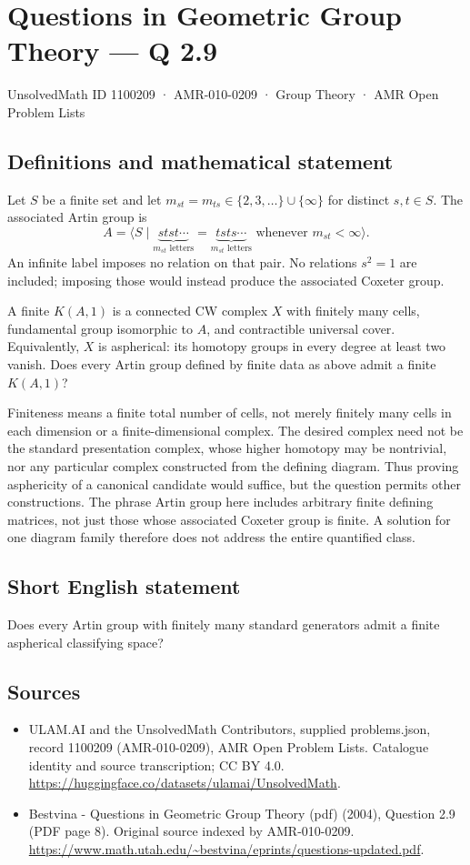 \documentclass[11pt,a4paper]{article}
\begin{document}
\section*{Questions in Geometric Group Theory — Q 2.9}\label{1100209}
{\small UnsolvedMath ID 1100209 · AMR-010-0209 · Group Theory · AMR Open Problem Lists}
\subsection{Definitions and mathematical statement}
Let $S$ be a finite set and let $m_{st}=m_{ts}\in\{2,3,\ldots\}\cup\{\infty\}$ for distinct $s,t\in S$. The associated Artin group is
\[
 A=\langle S\mid
 \underbrace{stst\cdots}_{m_{st}\text{ letters}}
 =\underbrace{tsts\cdots}_{m_{st}\text{ letters}}
 \text{ whenever }m_{st}<\infty\rangle.
\]
An infinite label imposes no relation on that pair. No relations $s^2=1$ are included; imposing those would instead produce the associated Coxeter group.

A finite $K(A,1)$ is a connected CW complex $X$ with finitely many cells, fundamental group isomorphic to $A$, and contractible universal cover. Equivalently, $X$ is aspherical: its homotopy groups in every degree at least two vanish. Does every Artin group defined by finite data as above admit a finite $K(A,1)$?

Finiteness means a finite total number of cells, not merely finitely many cells in each dimension or a finite-dimensional complex. The desired complex need not be the standard presentation complex, whose higher homotopy may be nontrivial, nor any particular complex constructed from the defining diagram. Thus proving asphericity of a canonical candidate would suffice, but the question permits other constructions. The phrase Artin group here includes arbitrary finite defining matrices, not just those whose associated Coxeter group is finite. A solution for one diagram family therefore does not address the entire quantified class.
\subsection{Short English statement}
Does every Artin group with finitely many standard generators admit a finite aspherical classifying space?
\subsection{Sources}
\begin{itemize}
\item[S1] ULAM.AI and the UnsolvedMath Contributors, supplied problems.json, record 1100209 (AMR-010-0209), AMR Open Problem Lists. Catalogue identity and source transcription; CC BY 4.0.
\url{https://huggingface.co/datasets/ulamai/UnsolvedMath}.
\item[S2] Bestvina - Questions in Geometric Group Theory (pdf) (2004), Question 2.9 (PDF page 8). Original source indexed by AMR-010-0209.
\url{https://www.math.utah.edu/~bestvina/eprints/questions-updated.pdf}.
\end{itemize}
\end{document}

